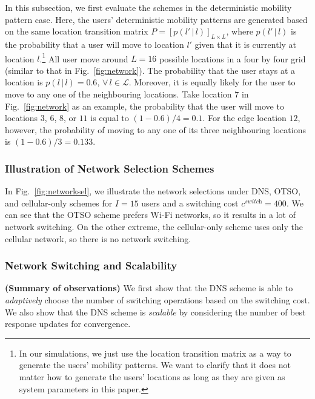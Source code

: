 \documentclass[journal]{IEEEtran}
\begin{document}
	In this subsection, we first evaluate the schemes in the deterministic mobility pattern case.
	Here, the users' deterministic mobility patterns are generated based on the same location transition matrix $P = [p(l' \,|\, l)]_{L \times L}$, where $p(l' \,|\, l)$ is the probability that a user will move to location $l'$ given that it is currently at location $l$.\footnote{In our simulations, we just use the location transition matrix as a way to generate the users' mobility patterns. We want to clarify that it does not matter how to generate the users' locations as long as they are given as system parameters in this paper.} 
	All user move around $L = 16$ possible locations in a four by four grid (similar to that in Fig.~\ref{fig:network}).
	The probability that the user stays at a location is $p(l \,|\, l) = 0.6, \, \forall \, l \in \mathcal{L}$. Moreover, it is equally likely for the user to move to any one of the neighbouring locations. 
	Take location $7$ in Fig.~\ref{fig:network} as an example, the probability that the user will move to locations $3$, $6$, $8$, or $11$ is equal to $(1-0.6)/4 = 0.1$.  
  For the edge location $12$, however, the probability of  moving to any one of its three neighbouring locations is $(1-0.6)/3 = 0.133$.


\subsubsection{Illustration of Network Selection Schemes}

  In Fig.~\ref{fig:networksel}, we illustrate the network selections under DNS, OTSO, and cellular-only schemes for $I = 15$ users and a switching cost $c^{\textit{switch}} = 400$. 
	We can see that the OTSO scheme prefers Wi-Fi networks, so it results in a lot of network switching.
	On the other extreme, the cellular-only scheme uses only the cellular network, so there is no network switching.






\subsubsection{Network Switching and Scalability} %

  \textbf{(Summary of observations)} We first show that the DNS scheme is able to \emph{adaptively} choose the number of switching operations based on the switching cost. %
	We also show that the DNS scheme is \emph{scalable} by considering the number of best response updates for convergence.
\end{document}
